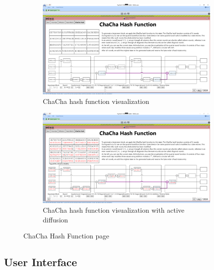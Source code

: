 \begin{figure}
\centering
\begin{subfigure}{\textwidth}
  \centering
  \includegraphics[width=\textwidth]{figures/chachahash}
  \caption{ChaCha hash function visualization}
  \label{chachahash.inactive}
\end{subfigure}

\begin{subfigure}{\textwidth}
  \centering
  \includegraphics[width=\textwidth]{figures/chachahash-diffusion}
  \caption{ChaCha hash function visualization with active diffusion}
  \label{chachahash.active}
\end{subfigure}
\caption{ChaCha Hash Function page}
\label{chachahash}
\end{figure}

\subsection{User Interface}
\label{sec:userInterface}

